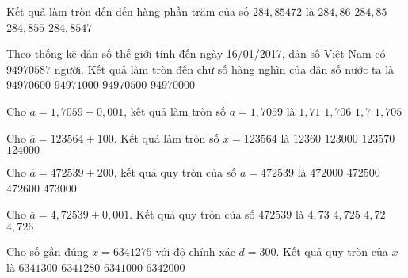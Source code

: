 \begin{ex}%
	Kết quả làm tròn đến đến hàng phần trăm của số $ 284,85472 $ là
	\choice
	{ $284,86 $}
	{\True $284,85  $}
	{ $284,855  $}
	{ $ 284,8547 $}
\end{ex}

\begin{ex}%
	Theo thống kê dân số thế giới tính đến ngày 16/01/2017, dân số Việt Nam có $ 94970587 $ người. Kết quả làm tròn đến chữ số hàng nghìn của dân số nước ta là
	\choice
	{ $ 94970600$}
	{ \True $  94971000$}
	{ $ 94970500 $}
	{ $ 94970000 $}
\end{ex}

\begin{ex}%
	Cho  $ \overline{a} = 1,7059\pm 0,001$, kết quả làm tròn số $ a = 1,7059 $ là
	\choice
	{\True $ 1,71$}
	{ $ 1,706 $}
	{ $ 1,7 $}
	{ $ 1,705 $}
\end{ex}

\begin{ex}%
	Cho $ \overline{a} = 123564\pm 100$. Kết quả làm tròn số $ x = 123564 $ là
	\choice
	{$12360 $}
	{ $ 123000 $}
	{ $ 123570 $}
	{\True  $ 124000 $}
\end{ex}

\begin{ex}%
	Cho $ \overline{a} = 472539  \pm  200 $, kết quả quy tròn của số $ a = 472539 $ là
	\choice
	{ $ 472000$}
	{ $ 472500 $}
	{ $  472600$}
	{\True $ 473000 $}
\end{ex}

\begin{ex}%
	Cho $ \overline{a} = 4,72539  \pm  0,001$. Kết quả quy tròn của số $ 472539 $ là
	\choice
	{\True $4,73 $}
	{ $ 4,725 $}
	{ $ 4,72 $}
	{ $ 4,726 $}
\end{ex}

\begin{ex}%
	Cho số gần đúng $ x=6341275 $ với độ chính xác $ d=300 $. Kết quả quy tròn của $ x $ là
	\choice
	{ $6341300 $}
	{ $ 6341280 $}
	{\True $ 6341000  $}
	{ $6342000 $}
\end{ex}



